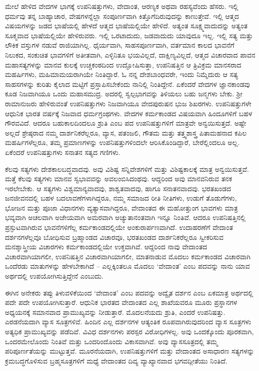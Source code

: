 ಮೇಲೆ ಹೇಳಿದ ವೇದಗಳ ಭಾಗಕ್ಕೆ ಉಪನಿಷತ್ತುಗಳು, ವೇದಾಂತ, ಆರಣ್ಯಕ ಅಥವಾ ರಹಸ್ಯವೆಂದು ಹೆಸರು. ಇಲ್ಲಿ ಧರ್ಮವು ತನ್ನ ಬಾಹ್ಯಾಚಾರ, ವೇಷಗಳನ್ನೆಲ್ಲಾ ಸಂಪೂರ್ಣವಾಗಿ ಕಿತ್ತೊಗೆದಿರುವುದನ್ನು ಕಾಣುತ್ತೇವೆ. ಇಲ್ಲಿ ಆತ್ಮದ ವಿಷಯಗಳನ್ನು ಜಡದ ಭಾಷೆಯಲ್ಲಿ ಹೇಳದೆ ಆತ್ಮದ ಭಾಷೆಯಲ್ಲಿಯೇ ಹೇಳಿದೆ. ಅತ್ಯಂತ ಸೂಕ್ಷ್ಮವಾದುದನ್ನು ಅತ್ಯಂತ ಸೂಕ್ಮವಾದ ಭಾಷೆಯಲ್ಲಿಯೇ ಹೇಳಿರುವರು. ಇಲ್ಲಿ ಒರಟಾದುದು, ಜಡವಾದುದು ಯಾವುದೂ ಇಲ್ಲ. ಇಲ್ಲಿ ಸತ್ಯ ಮತ್ತು ಲೌಕಿಕ ವಸ್ತುಗಳ ನಡುವೆ ರಾಜಿಯಾಗಿಲ್ಲ. ಧೈರ್ಯವಾಗಿ, ಸಾಹಸಪೂರ್ಣವಾಗಿ, ವರ್ತಮಾನ ಕಾಲದ ಭಾವನೆಗೆ ನಿಲುಕದ, ಸಂಕುಚಿತ ಭಾವಗಳಿಗೆ ಅತೀತವಾಗಿ, ಎಳ್ಳಿನಿತೂ ಭಯವಿಲ್ಲದೆ, ದಾಕ್ಷಿಣ್ಯವಿಲ್ಲದೆ, ಆತ್ಮದ ವಿಚಾರವಾದ ಪಾವನ ಮಹಾಸತ್ಯಗಳನ್ನು ಮಾನವ ಕುಲಕ್ಕೆ ಉಚ್ಚಕಂಠದಿಂದ ಉದ್ಘೋಷಿಸುತ್ತಾ, ಉಪನಿಷತ್ತಿನ ಆ ತ್ರಿವಿಕ್ರಮ ಮಾನಸರಾದ ಮಹರ್ಷಿಗಳು, ಮಹಿಮಾಮಯರಾಗಿಯೇ ನಿಂತಿದ್ದಾರೆ. ಓ ನನ್ನ ದೇಶಬಾಂಧವರೇ, ಇಂದು ನಿಮ್ಮೆದುರು ಆ ಸತ್ಯ ಸಾಹಸಗಳನ್ನು ಕುರಿತು ಕೈಲಾದ ಮಟ್ಟಿಗೆ ಪ್ರಸ್ತಾಪಿಸಬೇಕೆಂದು ನಾನಿಲ್ಲಿ ನಿಂತಿದ್ದೇನೆ. ಏಕೆಂದರೆ ವೇದಗಳ ಜ್ಞಾನಕಾಂಡವು ಕೂಡ ನಿಜವಾಗಿಯೂ ಒಂದು ಮಹಾಸಮುದ್ರ. ಅದರಲ್ಲಿ ಸ್ವಲ್ಪಭಾಗವನ್ನು ತಿಳಿಯಲು ಬಹು ಜನ್ಮಗಳು ಬೇಕು. ಶ‍್ರೀ ರಾಮಾನುಜರು ಹೇಳಿರುವಂತೆ ಉಪನಿಷತ್ತುಗಳು ನಿಜವಾಗಿಯೂ ವೇದಪುರುಷನ ಭುಜ ಶಿಖರಗಳು. ಉಪನಿಷತ್ತುಗಳೇ ಆಧುನಿಕ ಭಾರತ ವರ್ಷಕ್ಕೆ ನಿಜವಾದ ಧರ್ಮಗ್ರಂಥಗಳು. ವೇದಗಳ ಕರ್ಮಕಾಂಡದ ವಿಷಯವಾಗಿ ಹಿಂದೂಗಳಿಗೆ ಬಹಳ ಗೌರವವಿದೆ. ಆದರೂ ಬಹುಕಾಲದಿಂದಲೂ ಶ್ರುತಿ ಎಂಬ ಪದ ಉಪನಿಷತ್ತುಗಳಿಗೆ ಮಾತ್ರವೇ ಅನ್ವಯಿಸುತ್ತದೆ. ಅಷ್ಟೇ ಅಲ್ಲದೆ ಶ್ರೇಷ್ಠರಾದ ನಮ್ಮ ದಾರ್ಶನಿಕರೆಲ್ಲರೂ, ವ್ಯಾಸ, ಪತಂಜಲಿ, ಗೌತಮ ಮತ್ತು ತತ್ತ್ವಶಾಸ್ತ್ರ ಪಿತಾಮಹನಾದ ಕಪಿಲ ಮಹರ್ಷಿಗಳೆಲ್ಲರೂ, ತಮ್ಮ ಪ್ರಮಾಣಗಳನ್ನು ಉಪನಿಷತ್ತುಗಳಿಂದಲೇ ಆರಿಸಿಕೊಂಡಿದ್ದಾರೆ, ಬೇರೆಲ್ಲಿಂದಲೂ ಅಲ್ಲ. ಏಕೆಂದರೆ ಉಪನಿಷತ್ತುಗಳು ಸನಾತನ ಸತ್ಯದ ಗಣಿಗಳು.

ಕೆಲವು ಸತ್ಯಗಳು ದೇಶಕಾಲಬದ್ಧವಾದವು. ಅವು ವಿಶಿಷ್ಟ ಸನ್ನಿವೇಶಗಳಿಗೆ ಮತ್ತು ವಿಶಿಷ್ಟಕಾಲಕ್ಕೆ ಮಾತ್ರ ಅನ್ವಯಿಸುತ್ತವೆ. ಮತ್ತೆ ಕೆಲವು ಸತ್ಯಗಳು ಮಾನವ ಸ್ವಭಾವವನ್ನು ಅವಲಂಬಿಸಿದಂಥವು. ಆದ್ದರಿಂದ ಅವು ಮಾನವನಿರುವ ತನಕ ಇರಲೇಬೇಕು. ಆ ಸತ್ಯಗಳು ವಿಶ್ವಮಾನ್ಯವಾದವು, ಶಾಶ್ವತವಾದವು, ಹಾಗೂ ಸನಾತನವಾದವು. ಭರತಖಂಡದ ಜನಜೀವನದಲ್ಲಿ ಬಹಳ ಬದಲಾವಣೆಗಳಾಗಿದ್ದರೂ, ನಮ್ಮ ಸಮಾಜದ ರೀತಿ ನೀತಿಗಳು, ಉಡುಗೆ ತೊಡುಗೆಗಳು, ಭೋಜನ ಮತ್ತು ಪೂಜಾ ವಿಧಾನಗಳು ವ್ಯತ್ಯಾಸವಾಗಿದ್ದರೂ, ವೇದಾಂತದ ಈ ಮಹೋತ್ತುಂಗ ಭಾವಗಳು ಮಾತ್ರ ಭವ್ಯವಾಗಿ ಅಚಲವಾಗಿ ಅಜೇಯವಾಗಿ ಅಮರವಾಗಿ ಅಚ್ಯುತಾನಂತವಾಗಿ ಇನ್ನೂ ನಿಂತಿವೆ. ಆದರೂ ಉಪನಿಷತ್ತಿನಲ್ಲಿ ಪ್ರಸ್ಫುಟವಾಗಿರುವ ಭಾವನೆಗಳಿಗೆಲ್ಲ ಕರ್ಮಕಾಂಡದಲ್ಲಿಯೇ ಅಂಕುರಾರ್ಪಣವಾಗಿದೆ. ಉದಾಹರಣೆಗೆ ವೇದಾಂತ ದರ್ಶನಗಳೆಲ್ಲವೂ ಬೋಧಿಸುವ ಬ್ರಹ್ಮಾಂಡದ ವಿಚಾರವೂ, ಭರತಖಂಡದ ದಾರ್ಶನಿಕರೆಲ್ಲರೂ ಸ್ವೀಕರಿಸುವ ಮನಶ್ಶಾಸ್ತ್ರೀಯ ವಿಚಾರಗಳು ಕರ್ಮಕಾಂಡದಲ್ಲಿಯೇ ಉಕ್ತವಾಗಿವೆ. ಆದ್ದರಿಂದ ನಾವು ವೇದಾಂತದ ವಿಚಾರವಾಗಿಯಾಗಲೀ, ಉಪನಿಷತ್ತಿನ ವಿಚಾರವಾಗಿಯಾಗಲೀ, ಮಾತನಾಡುವ ಮೊದಲು ಕರ್ಮಕಾಂಡದ ವಿಚಾರವಾಗಿ ಒಂದೆರಡು ಮಾತುಗಳನ್ನು ಹೇಳಬೇಕಾಗಿದೆ – ಎಲ್ಲಕ್ಕಿಂತಲೂ ಮೊದಲು ‘ವೇದಾಂತ’ ಎಂಬ ಪದವನ್ನು ನಾನು ಯಾವ ಅರ್ಥದಲ್ಲಿ ಉಪಯೋಗಿಸುತ್ತಿದ್ದೇನೆ ಎಂಬುದು.

ಈಗಿನ ಅನೇಕರು ತಪ್ಪು ತಿಳುವಳಿಕೆಯಿಂದ ‘ವೇದಾಂತ’ ಎಂಬ ಪದವನ್ನು ಅದ್ವೈತ ದರ್ಶನ ಎಂಬ ಏಕಮಾತ್ರ ಅರ್ಥದಲ್ಲಿ ಪದೇ ಪದೇ ಉಪಯೋಗಿಸುತ್ತಾರೆ. ಆಧುನಿಕ ಭಾರತದ ವೇದಾಂತದ ಎಲ್ಲ ಶಾಖೆಯವರೂ ಮೂರು ಪ್ರಸ್ಥಾನಗಳ ಅಧ್ಯಯನಕ್ಕೆ ಸಮಾನವಾದ ಪ್ರಾಮುಖ್ಯವನ್ನು ನೀಡುತ್ತಾರೆ. ಮೊದಲನೆಯದು ಶ್ರುತಿ, ಎಂದರೆ ಉಪನಿಷತ್ತು. ಎರಡನೆಯದಾಗಿ ವ್ಯಾಸ ಸೂತ್ರಗಳಿವೆ. ಹಿಂದಿನ ಎಲ್ಲ ದರ್ಶನಗಳ ಆತ್ಯಂತಿಕ ರೂಪವಾಗಿರುವುದರಿಂದ ವ್ಯಾಸ ಸೂತ್ರಗಳು ಅತ್ಯಧಿಕ ಪ್ರಾಮುಖ್ಯವನ್ನು ಪಡೆದಿವೆ. ವಿವಿಧ ದರ್ಶನಗಳು ಪರಸ್ಪರ ವಿರೋಧಿಗಳಲ್ಲ. ಅವು ಒಂದಕ್ಕೊಂದು ಪೂರಕವಾಗಿ, ಒಂದರಮೇಲೊಂದು ನಿಂತಿವೆ ಮತ್ತು ಒಂದರಿಂದೊಂದು ವಿಕಾಸವಾಗಿವೆ. ಅವು ವ್ಯಾಸಸೂತ್ರದಲ್ಲಿ ತಮ್ಮ ಪರಿಪೂರ್ಣತೆಯನ್ನು ಮುಟ್ಟುತ್ತವೆ. ಮೂರನೆಯದಾಗಿ, ಉಪನಿಷತ್ತುಗಳಿಗೆ ಮತ್ತು ವೇದಾಂತದ ಅಸಾಧಾರಣ ಸತ್ಯಗಳನ್ನು ಕ್ರಮಬದ್ಧಗೊಳಿಸುವ ಬ್ರಹ್ಮಸೂತ್ರಗಳಿಗೆ ಮಧ್ಯೆ ವೇದಾಂತದ ದಿವ್ಯ ವ್ಯಾಖ್ಯಾನವಾದ ಭಗವದ್ಗೀತೆಯು ನಿಂತಿದೆ.

